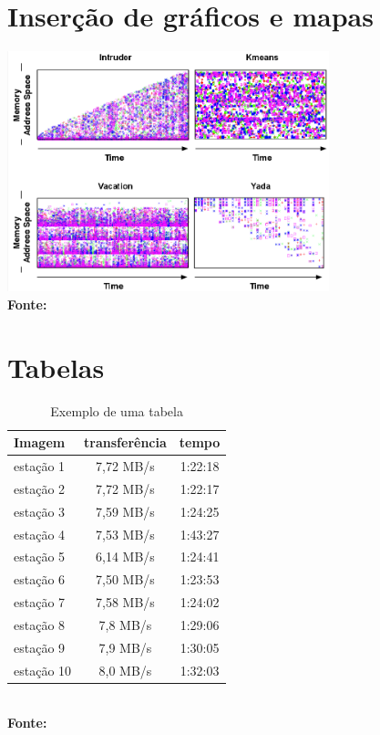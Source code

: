 \section{\esp Inserção de gráficos e mapas}

\begin{grafico}
	\centering	
	\includegraphics[width=0.7\textwidth]{figuras/access.png}
	\\\textbf{\footnotesize Fonte: }
	\label{gra:grafico1}
\end{grafico}


 \section{\esp Tabelas}

\begin{table}[htb]
	\centering
	\caption{\hspace{0.1cm} Exemplo de uma tabela}
	\vspace{-0.3cm} %
	\label{tab:tabela1}
	\begin{tabular}{l|c|c}
  \hline
    \textbf{Imagem}	& \textbf{transferência} & \textbf{tempo} \\
    \hline
     estação 1	& 7,72 MB/s &  1:22:18 \\
     estação 2	& 7,72 MB/s &  1:22:17 \\
     estação 3	& 7,59 MB/s & 1:24:25 \\
     estação 4  & 7,53 MB/s & 1:43:27 \\
     estação 5	& 6,14 MB/s  &  1:24:41 \\
     estação 6  &  7,50 MB/s & 1:23:53 \\
     estação 7  & 7,58 MB/s  &  1:24:02 \\
     estação 8  & 7,8 MB/s  &  1:29:06 \\
     estação 9  & 7,9 MB/s  &  1:30:05 \\
     estação 10 & 8,0 MB/s  &  1:32:03 \\
     \hline
 \end{tabular}
	\small
	{\footnotesize\\ \textbf{Fonte: }}
\end{table}


